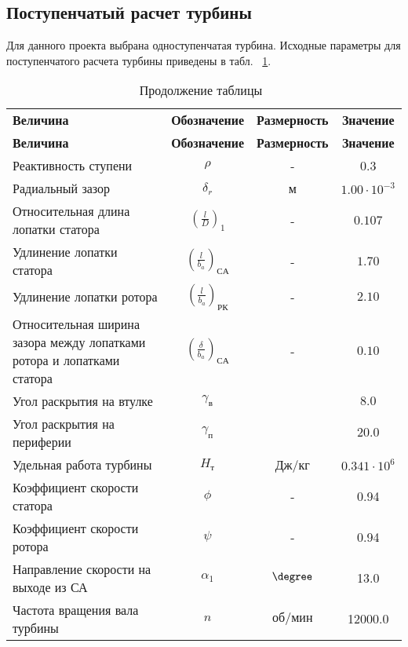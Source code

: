 \subsection{Поступенчатый расчет турбины}
Для данного проекта выбрана одноступенчатая турбина.
Исходные параметры для поступенчатого расчета турбины приведены в табл. ~\ref{turbine:midline_inlet}.
\begin{center}
	\begin{longtable}{|p{4cm}|c|c|c|}
		\caption{Исходные параметры поступенчатого расчета турбины}
		\label{turbine:midline_inlet}
		\endfirsthead
		\caption*{\tabcapalign Продолжение таблицы~\thetable}\\[-0.45\onelineskip]
		\hline
		\textbf{Величина} & \textbf{Обозначение} & \textbf{Размерность} & \textbf{Значение} \\ \hline
		\endhead
		\hline
		\textbf{Величина} & \textbf{Обозначение} & \textbf{Размерность} & \textbf{Значение} \\ \hline
			Реактивность ступени & $\rho$ & - & 0.3  \\ \hline
			Радиальный зазор & $\delta_r$ & м & $1.00 \cdot 10^{-3}$ \\ \hline
			Относительная длина лопатки статора & $\left( \frac{l}{D} \right)_1$ & - & $0.107$ \\ \hline
			Удлинение лопатки статора & $\left( \frac{l}{b_a} \right)_{СА}$ & - & $1.70$ \\ \hline
			Удлинение лопатки ротора & $\left( \frac{l}{b_a} \right)_{РК}$ & - & $2.10$ \\ \hline
			Относительная ширина зазора между лопатками ротора и лопатками статора & $\left( \frac{\delta}{b_a} \right)_{СА}$ & - & $0.10$ \\ \hline
			Угол раскрытия на втулке & $\gamma_{в}$ & \degree & $8.0$ \\ \hline
			Угол раскрытия на периферии & $\gamma_{п}$ & \degree & $20.0$ \\ \hline
			Удельная работа турбины & $H_т$ & Дж/кг & $0.341 \cdot 10^6$ \\ \hline
			Коэффициент скорости статора & $\phi$ & - & 0.94 \\ \hline
			Коэффициент скорости ротора & $\psi$ & - & 0.94 \\ \hline
			Направление скорости на выходе из СА & $\alpha_1$ & $\degree$ & 13.0 \\ \hline
			Частота вращения вала турбины & $n$ & $об/мин$ & 12000.0 \\ \hline
	\end{longtable}
\end{center}

